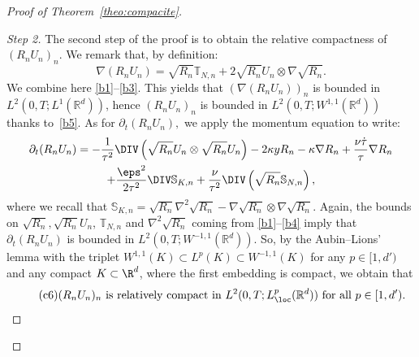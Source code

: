 \begin{proof}[Proof of Theorem~\ref{theo:compacite}]
\begin{proof}[Step 2]
The second step of the proof is to obtain the relative compactness of $(R_nU_n)_{n}.$ We remark that, by definition:
\[
\nabla (R_nU_n) = \sqrt{R_n} \mathbb T_{N,n} + 2 \sqrt{R_n} U_n \otimes \nabla \sqrt{R_n}.
\]
We combine here \eqref{b1}--\eqref{b3}. This yields that $(\nabla(R_n U_n))_n$ is bounded in\linebreak $L^{2}(0,T;L^{1}(\mathbb R^d))$, hence $(R_n U_n)_{n}$ is bounded in $L^{2}(0,T;W^{1,1}(\mathbb R^d))$ thanks to~\eqref{b5}. As for $\partial_{t}(R_nU_n),$ we apply the momentum equation to write:
\begin{multline*}
\partial_t (R_nU_n) = - \frac{1}{\tau^2}\DIV \left(\sqrt{R_n}U_n \otimes \sqrt{R_n}U_n\right) - 2\kappa y R_n - \kappa \nabla R_n + \dfrac{\nu \dot{\tau}}{\tau} \nabla R_n \\
 + \dfrac{\eps^2}{2 \tau^2} \DIV \mathbb S_{K,n} + \dfrac{\nu}{\tau^2} \DIV \left(\sqrt{R_n}\mathbb S_{N,n}\right),
\end{multline*}
where we recall that $\mathbb S_{K,n} = \sqrt{R_n} \nabla^2
\sqrt{R_n} - \nabla\sqrt{R_n} \otimes \nabla \sqrt{R_n} $. Again, the bounds on $\sqrt{R_n},\sqrt{R_n}U_n$, $\mathbb T_{N,n}$ and $\nabla^2 \sqrt{R_n}$ coming from \eqref{b1}--\eqref{b4} imply that $\partial_t (R_n U_n)$ is bounded in $L^{2}(0,T;W^{-1,1}(\mathbb R^d)).$ So, by the Aubin--Lions' lemma with the triplet $W^{1,1}(K) \subset L^{p}(K) \subset W^{-1,1}(K)$ for any $p \in [1,d')$ and any compact $K \subset \R^d$, where the first embedding is compact, we obtain that
\begin{equation*}\label{eq_cvgmomentum}
\tag{c6}
\text{$({R}_nU_n)_{n}$ is relatively compact in $L^2(0,T;L^{p}_{\loc}(\mathbb R^d))$ for all $p \in [1,d')$.}
\end{equation*}


\end{proof}
\end{proof}
